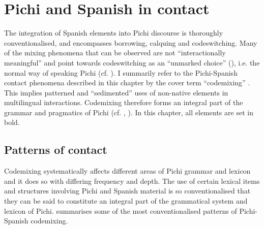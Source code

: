 \chapter{Pichi and Spanish in contact}
The integration of Spanish elements into Pichi discourse is thoroughly conventionalised, and encompasses borrowing, calquing and codeswitching. Many of the mixing phenomena that can be observed are not “interactionally meaningful” \citep[20]{Auer1998} and point towards codeswitching as an “unmarked choice” (\citealt{Scotton1993}), i.e. the normal way of speaking Pichi (cf. \citealt{Yakpo2015,Yakpo2017}). I summarily refer to the Pichi-Spanish contact phenomena described in this chapter by the cover term “codemixing” \citep{Muysken2000}. This implies patterned and “sedimented” \citep{Auer1999} uses of non-native elements in multilingual interactions. Codemixing therefore forms an integral part of the grammar and pragmatics of Pichi (cf. \citealt{Yakpo2009complexity}, \citealt{Yakpo2018}). In this chapter, all  elements are set in bold. 

\section{Patterns of contact}\label{sec:13.1}

Codemixing systematically affects different areas of Pichi grammar and lexicon and it does so with differing frequency and depth. The use of certain lexical items and structures involving Pichi and Spanish material is so conventionalised that they can be said to constitute an integral part of the grammatical system and lexicon of Pichi.  summarises some of the most conventionalised patterns of Pichi-Spanish codemixing.

